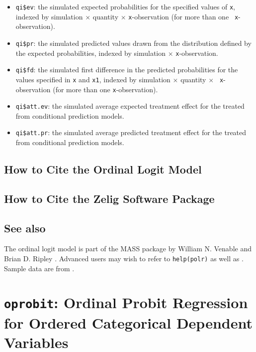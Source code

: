 \documentclass{article}
\begin{document}
\begin{itemize}
   \begin{itemize}
   \item {\tt qi\$ev}: the simulated expected probabilities for the
     specified values of {\tt x}, indexed by simulation $\times$
     quantity $\times$ {\tt x}-observation (for more than one {\tt
       x}-observation).
   \item {\tt qi\$pr}: the simulated predicted values drawn from the
     distribution defined by the expected probabilities, indexed by
     simulation $\times$ {\tt x}-observation.
   \item {\tt qi\$fd}: the simulated first difference in the predicted
     probabilities for the values specified in {\tt x} and {\tt x1},
     indexed by simulation $\times$ quantity $\times$ {\tt
       x}-observation (for more than one {\tt x}-observation).
   \item {\tt qi\$att.ev}: the simulated average expected treatment
     effect for the treated from conditional prediction models.  
   \item {\tt qi\$att.pr}: the simulated average predicted treatment
     effect for the treated from conditional prediction models.  
   \end{itemize}
\end{itemize}

\subsection*{How to Cite the Ordinal Logit Model}

\subsection*{How to Cite the Zelig Software Package}
\CiteZelig

\subsection* {See also}
The ordinal logit model is part of the MASS package by William N. Venable and Brian D. Ripley \citep{VenRip02}. Advanced users may wish to refer to \texttt{help(polr)} as well as \cite{McCNel89}. Sample data are from \cite{Martin92}.



\section{{\tt oprobit}: Ordinal Probit Regression for Ordered
Categorical Dependent Variables}\label{oprobit}
\end{document}
